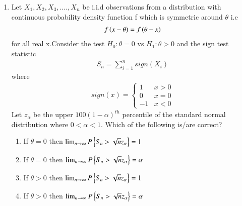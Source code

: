 \renewcommand{\theequation}{\theenumi}
\renewcommand{\thefigure}{\theenumi}
\renewcommand{\thetable}{\theenumi}
\begin{enumerate}[label=\thesection.\arabic*.,ref=\thesection.\theenumi]

\item Let $X_1,X_2,X_3,....,X_n$ be i.i.d observations from a distribution with continuous probability density function f which is symmetric around $\theta$ i.e
\begin{align}
    f\left(x-\theta\right)=f\left(\theta -x\right)
\end{align}
for all real x.Consider the test $H_0: \theta =0$ vs $H_1:  \theta >0$ and the sign test statistic
\begin{align}
    S_n = \sum_{i=1}^{n} sign(X_i)
\end{align}
where
\begin{align}
    sign(x) =
    \begin{cases}
    1  & x>0\\
    0  & x=0\\
    -1 & x<0
    \end{cases}
\end{align}
Let $z_\alpha$ be the upper $100(1-\alpha)^{th}$ percentile of the standard normal distribution where $0<\alpha <1$. Which of the following is/are correct?
\begin{enumerate}
    \item If $\theta =0$ then $ \lim_{n\to\infty} P\left\{S_n > \sqrt{n}z_{\alpha}\right\} =1 $\\
    \item If $\theta =0$ then $ \lim_{n\to\infty} P\left\{S_n > \sqrt{n}z_{\alpha}\right\} =\alpha $\\
    \item If $\theta >0$ then $ \lim_{n\to\infty} P\left\{S_n > \sqrt{n}z_{\alpha}\right\} = 1 $\\
    \item If $\theta >0$ then $ \lim_{n\to\infty} P\left\{S_n > \sqrt{n}z_{\alpha}\right\} =\alpha $
\end{enumerate}
%
\solution


\end{enumerate}